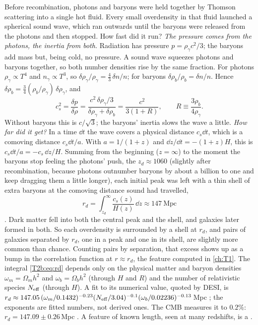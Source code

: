 Before recombination, photons and baryons were held together by Thomson scattering into a single hot fluid. Every small overdensity in that fluid launched a spherical sound wave, which ran outwards until the baryons were released from the photons and then stopped. How fast did it run? \emph{The pressure comes from the photons, the inertia from both.} Radiation has pressure $p=\rho_\gamma c^2/3$; the baryons add mass but, being cold, no pressure. A sound wave squeezes photons and baryons together, so both number densities rise by the same fraction. For photons $\rho_\gamma\propto T^4$ and $n_\gamma\propto T^3$, so $\delta\rho_\gamma/\rho_\gamma=\frac43\,\delta n/n$; for baryons $\delta\rho_b/\rho_b=\delta n/n$. Hence $\delta\rho_b=\frac34(\rho_b/\rho_\gamma)\,\delta\rho_\gamma$, and
\[
  c_s^2=\frac{\delta p}{\delta\rho}
  =\frac{c^2\,\delta\rho_\gamma/3}{\delta\rho_\gamma+\delta\rho_b}
  =\frac{c^2}{3(1+R)},\qquad R\equiv\frac{3\rho_b}{4\rho_\gamma}.
\]
Without baryons this is $c/\sqrt3$; the baryons' inertia slows the wave a little. \emph{How far did it get?} In a time $\dd t$ the wave covers a physical distance $c_s\dd t$, which is a comoving distance $c_s\dd t/a$. With $a=1/(1+z)$ and $\dd z/\dd t=-(1+z)H$, this is $c_s\dd t/a=-c_s\,\dd z/H$. Summing from the beginning ($z=\infty$) to the moment the baryons stop feeling the photons' push, the  $z_d\approx1060$ (slightly after recombination, because photons outnumber baryons by about a billion to one and keep dragging them a little longer), each initial peak was left with a thin shell of extra baryons at the comoving distance sound had travelled,
\begin{equation}
  r_d=\int_{z_d}^{\infty}\frac{c_s(z)}{H(z)}\,\dd z\approx147\ \text{Mpc}
  \label{T2b:eq:rd}
\end{equation}
\cite[eqs.~(2.3)--(2.4)]{DESI2024VI}. Dark matter fell into both the central peak and the shell, and galaxies later formed in both. So each overdensity is surrounded by a shell at $r_d$, and pairs of galaxies separated by $r_d$, one in a peak and one in its shell, are slightly more common than chance. Counting pairs by separation, that excess shows up as a bump in the correlation function at $r\approx r_d$, the feature computed in \cref{ch:T1}. The integral \eqref{T2b:eq:rd} depends only on the physical matter and baryon densities $\omega_m=\Omega_mh^2$ and $\omega_b=\Omega_bh^2$ (through $H$ and $R$) and the number of relativistic species $N_{\rm eff}$ (through $H$). A fit to its numerical value, quoted by DESI, is $r_d\approx147.05\,(\omega_m/0.1432)^{-0.23}(N_{\rm eff}/3.04)^{-0.1}(\omega_b/0.02236)^{-0.13}$\,Mpc \cite[eq.~(2.5)]{DESI2024VI}; the exponents are fitted numbers, not derived ones. The CMB measures it to $0.2\%$: $r_d=147.09\pm0.26$\,Mpc \cite[Table~2]{Planck2018VI}. A feature of known length, seen at many redshifts, is a .

